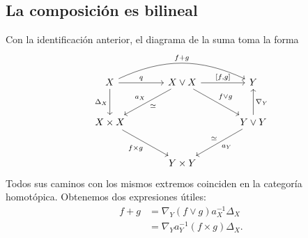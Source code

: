 \subsection{La composición es bilineal}

Con la identificación anterior, el diagrama de la suma toma la forma
\[
\begin{tikzcd}[column sep=large,row sep=large]
X\arrow[r,"q"]\arrow[d,"\Delta_X"']\arrow[rr,bend left=25,"f+g"]
&X\vee X\arrow[r,"{[f,g]}"]\arrow[dl,"a_X"',"\simeq"]\arrow[dr,"f\vee g"]&Y\\
X\times X\arrow[dr,"f\times g"']&&Y\vee Y\arrow[u,"\nabla_Y"']\arrow[dl,"a_Y","\simeq"']\\
&Y\times Y&
\end{tikzcd}
\]
Todos sus caminos con los mismos extremos coinciden en la categoría homotópica. Obtenemos dos expresiones útiles:
\begin{equation}\label{eq:c17-suma-canonica}
\begin{aligned}
f+g&=\nabla_Y(f\vee g)a_X^{-1}\Delta_X\\
&=\nabla_Ya_Y^{-1}(f\times g)\Delta_X.
\end{aligned}
\end{equation}

